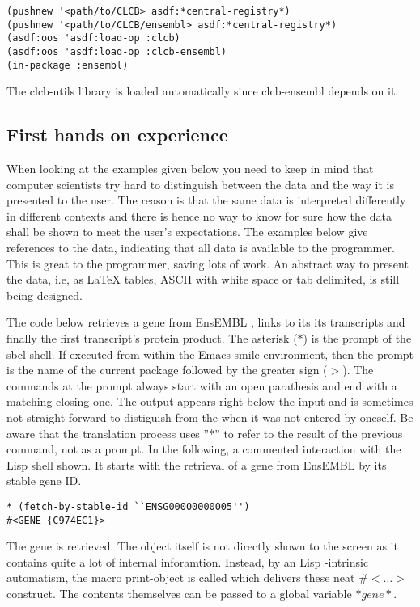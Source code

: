 \documentclass{book}
\newcommand\ensembl{EnsEMBL }
\newcommand\lisp{Lisp }
\begin{document}
\lstset{language=lisp}
\begin{lstlisting}
(pushnew '<path/to/CLCB> asdf:*central-registry*)
(pushnew '<path/to/CLCB/ensembl> asdf:*central-registry*)
(asdf:oos 'asdf:load-op :clcb)
(asdf:oos 'asdf:load-op :clcb-ensembl)
(in-package :ensembl)
\end{lstlisting}

The clcb-utils library is loaded automatically since clcb-ensembl depends on it.

\subsection{First hands on experience}

When looking at the examples given below you need to keep in mind that
computer scientists try hard to distinguish between the data and the
way it is presented to the user. The reason is that the same data
is interpreted differently in different contexts and there is hence
no way to know for sure how the data shall be shown to meet the user's
expectations. The examples below give references to the data, indicating
that all data is available to the programmer. This is great to the
programmer, saving lots of work. An abstract way to present the data,
i.e, as LaTeX tables, ASCII with white space or tab delimited, is still
being designed.

The code below retrieves a gene from \ensembl \cite{BiAnCaChClCoCoCuCuCuDoDuFeFlGrHaHeHoHu06}, links to its its
transcripts and finally the first transcript's protein product. The
asterisk ($*$) is the prompt of the sbcl shell. If executed from within
the Emacs smile environment, then the prompt is the name of the current
package followed by the greater sign ($>$).  The commands at the prompt
always start with an open parathesis and end with a matching closing
one. The output appears right below the input and is sometimes not
straight forward to distiguish from the when it was not entered by
oneself.  Be aware that the translation process uses ''*'' to refer to
the result of the previous command, not as a prompt. In the following,
a commented interaction with the \lisp shell shown. It starts with the
retrieval of a gene from \ensembl by its stable gene ID.

\begin{lstlisting}
* (fetch-by-stable-id ``ENSG00000000005'')
#<GENE {C974EC1}>
\end{lstlisting}

The gene is retrieved. The object itself is not directly shown to the
screen as it contains quite a lot of internal inforamtion. Instead, by
an \lisp-intrinsic automatism, the macro print-object is called which
delivers these neat $\#<\ldots>$ construct. The contents themselves can
be passed to a global variable $*gene*$.
\end{document}
